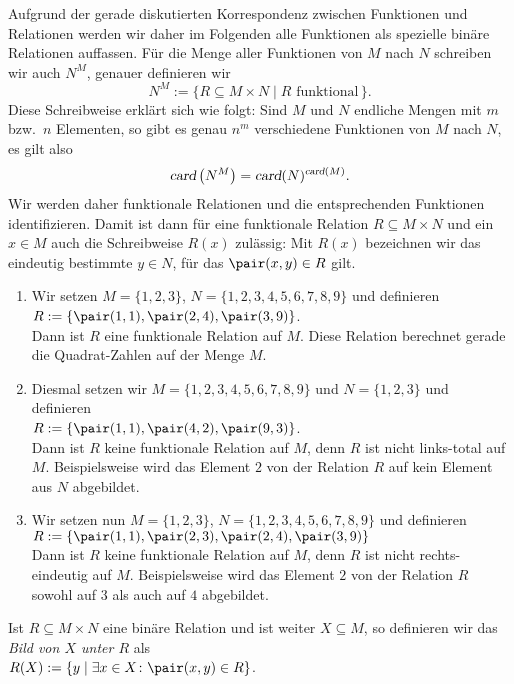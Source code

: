 Aufgrund der gerade diskutierten Korrespondenz zwischen Funktionen und Relationen
werden wir daher im Folgenden alle Funktionen als spezielle binäre Relationen auffassen.
Für die Menge aller Funktionen von $M$ nach $N$ schreiben wir auch $N^M$, genauer
definieren wir
\[ N^M := \{ R \subseteq M \times N \mid \mbox{$R$ funktional}\, \}. \]
Diese Schreibweise erklärt sich wie folgt: Sind $M$ und $N$ endliche Mengen mit $m$
bzw.~$n$ Elementen, so gibt es genau $n^m$ verschiedene Funktionen von $M$ nach $N$, es
gilt also
\[ \textsl{card}\left(N^M\right) = \textsl{card}(N)^{\textsl{card}(M)}. \]
Wir werden daher funktionale Relationen und die entsprechenden Funktionen identifizieren.
Damit ist dann für eine funktionale Relation $R \subseteq M \times N$ und ein $x \in M$
auch die Schreibweise $R(x)$ zulässig: Mit $R(x)$ bezeichnen wir das eindeutig bestimmte $y \in N$,
für das $\pair(x,y) \in R$ gilt.

\examples
\begin{enumerate}
\item Wir setzen $M = \{1,2,3\}$, $N = \{1,2,3,4,5,6,7,8,9\}$ und definieren \\[0.2cm]
      \hspace*{1.3cm} $R := \{ \pair(1,1),\pair(2,4),\pair(3,9) \}$. \\[0.2cm]
      Dann ist $R$ eine funktionale Relation auf $M$.  Diese Relation berechnet
      gerade die Quadrat-Zahlen auf der Menge $M$.
\item Diesmal setzen wir $M = \{1,2,3,4,5,6,7,8,9\}$ und $N = \{1,2,3\}$ und definieren \\[0.2cm]
      \hspace*{1.3cm} $R := \{ \pair(1,1),\pair(4,2),\pair(9,3) \}$. \\[0.2cm]
      Dann ist $R$ keine funktionale Relation auf $M$, denn $R$ ist nicht links-total auf
      $M$.  Beispielsweise wird das Element $2$ von der Relation $R$ auf kein Element aus 
      $N$ abgebildet.
\item Wir setzen nun  $M = \{1,2,3\}$, $N = \{1,2,3,4,5,6,7,8,9\}$ und definieren \\[0.2cm]
      \hspace*{1.3cm} $R := \{ \pair(1,1),\pair(2,3),\pair(2,4),\pair(3,9) \}$ \\[0.2cm]
      Dann ist $R$ keine funktionale Relation auf $M$, denn $R$ ist nicht rechts-eindeutig auf
      $M$.  Beispielsweise wird das Element $2$ von der Relation $R$ sowohl auf $3$ als
      auch auf $4$ abgebildet. \eox
\end{enumerate}
Ist $R \subseteq M \times N$ eine binäre Relation und ist weiter $X \subseteq M$, so
definieren wir das \emph{Bild von $X$ unter $R$} als \\[0.2cm]
\hspace*{1.3cm} $R(X) := \{ y \mid \exists x \in X \colon \pair(x,y) \in R \}$. 

